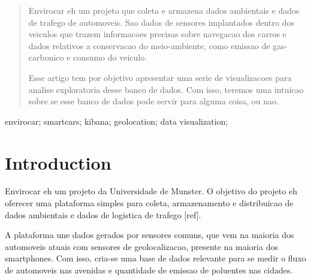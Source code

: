 \documentclass[10pt, conference]{IEEEtran}
\begin{document}
\maketitle


\begin{abstract}
Envirocar eh um projeto que coleta e armazena dados ambientais e dados de trafego
de automoveis. 
Sao dados de sensores implantados dentro dos veiculos que trazem informacoes
precisas sobre navegacao dos carros e dados relativos a conservacao do meio-ambiente, 
como emissao de gas-carbonico e consumo do veiculo. 

Esse artigo tem por objetivo apresentar uma serie de 
visualizacoes para analise exploratoria desse banco de dados. Com isso, teremos
uma intuicao sobre se esse banco de dados pode servir para alguma coisa, ou nao.

%
\end{abstract}

\begin{IEEEkeywords}
envirocar; smartcars; kibana; geolocation; data visualization;

\end{IEEEkeywords}


\IEEEpeerreviewmaketitle





\section{Introduction}
Envirocar eh um projeto da Universidade de Munster. O objetivo 
do projeto eh oferecer uma plataforma simples para coleta, 
armazenamento e distribuicao de dados ambientais e dados de logistica
de trafego [ref]. 

A plataforma une dados gerados por sensores comuns,
que vem na maioria dos automoveis atuais com sensores de 
geolocalizacao, presente na maioria dos smartphones. Com isso,
cria-se uma base de dados relevante para se medir o fluxo de automoveis
nas avenidas e quantidade de emissao de poluentes nas cidades. 
\end{document}
